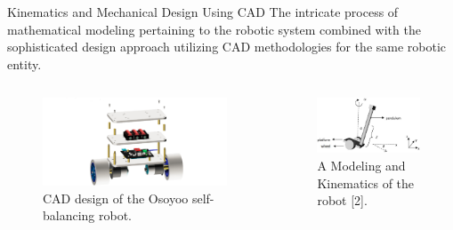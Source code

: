 \documentclass[final]{beamer}
\newlength{\colwidth}
\begin{document}
\begin{frame}[t]
\begin{columns}[t]
\begin{column}{\colwidth}
\begin{block}{Kinematics and Mechanical Design Using CAD}
	The intricate process of mathematical modeling pertaining to the robotic system combined with the sophisticated design approach utilizing CAD methodologies for the same robotic entity.
   \vspace{1em}

\begin{columns}
\begin{column}{0.5\textwidth}
\begin{center}
      \begin{figure}
	\includegraphics[width=1.0\textwidth]{logos/CAD.png}
      \caption{CAD design of the Osoyoo self-balancing robot.}
    \end{figure}
   \end{center}
\end{column}
\begin{column}{0.5\textwidth}  %
   \begin{center}
      \begin{figure}
	\includegraphics[width=.880\textwidth]{logos/Kin.png}
	\caption{A Modeling and Kinematics of the robot [2].}
    \end{figure}
   \end{center}
\end{column}
\end{columns}



\end{block}
\end{column}
\end{columns}
\end{frame}
\end{document}
